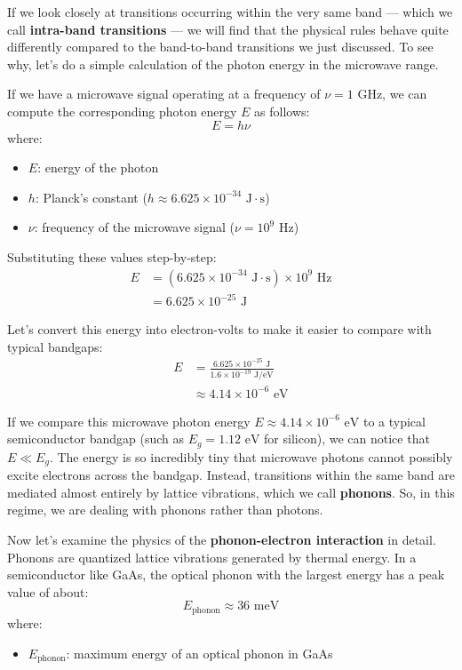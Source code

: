 If we look closely at transitions occurring within the very same band — which we call \textbf{intra-band transitions} — we will find that the physical rules behave quite differently compared to the band-to-band transitions we just discussed. To see why, let's do a simple calculation of the photon energy in the microwave range.

If we have a microwave signal operating at a frequency of $\nu = 1\text{ GHz}$, we can compute the corresponding photon energy $E$ as follows:
\begin{equation*}
    E = h\nu
\end{equation*}
where:
\begin{itemize}
    \item $E$: energy of the photon
    \item $h$: Planck's constant ($h \approx 6.625 \times 10^{-34}\text{ J}\cdot\text{s}$)
    \item $\nu$: frequency of the microwave signal ($\nu = 10^9\text{ Hz}$)
\end{itemize}

Substituting these values step-by-step:
\begin{align*}
    E & = \left(6.625 \times 10^{-34}\text{ J}\cdot\text{s}\right) \times 10^9\text{ Hz} \\
      & = 6.625 \times 10^{-25}\text{ J}
\end{align*}

Let's convert this energy into electron-volts to make it easier to compare with typical bandgaps:
\begin{align*}
    E & = \frac{6.625 \times 10^{-25}\text{ J}}{1.6 \times 10^{-19}\text{ J/eV}} \\
      & \approx 4.14 \times 10^{-6}\text{ eV}
\end{align*}

If we compare this microwave photon energy $E \approx 4.14 \times 10^{-6}\text{ eV}$ to a typical semiconductor bandgap (such as $E_g = 1.12\text{ eV}$ for silicon), we can notice that $E \ll E_g$. The energy is so incredibly tiny that microwave photons cannot possibly excite electrons across the bandgap. Instead, transitions within the same band are mediated almost entirely by lattice vibrations, which we call \textbf{phonons}. So, in this regime, we are dealing with phonons rather than photons.

Now let's examine the physics of the \textbf{phonon-electron interaction} in detail. Phonons are quantized lattice vibrations generated by thermal energy. In a semiconductor like GaAs, the optical phonon with the largest energy has a peak value of about:
\begin{equation*}
    E_\text{phonon} \approx 36\text{ meV}
\end{equation*}
where:
\begin{itemize}
    \item $E_\text{phonon}$: maximum energy of an optical phonon in GaAs
\end{itemize}

